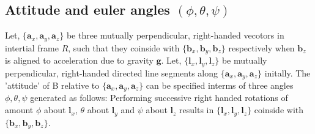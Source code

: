 
\subsection{Attitude and euler angles $(\phi, \theta, \psi)$}

Let, $\{ \pmb a_x, \pmb a_y, \pmb a_z \}$ be three mutually perpendicular,
right-handed vecotors in intertial frame $R$, such that they coinside with
$\{ \pmb b_x, \pmb b_y, \pmb b_z\}$ respectively when $\pmb b_z$ is aligned to
acceleration due to gravity $\pmb g$.
Let, $\{ \pmb l_x, \pmb l_y, \pmb l_z\}$ be mutually perpendicular,
right-handed directed line segments along $\{ \pmb a_x, \pmb a_y, \pmb a_z \}$
initally.
The 'attitude' of B relative to $\{ \pmb a_x, \pmb a_y, \pmb a_z \}$ can be
specified interms of  three angles $\phi, \theta, \psi$ generated as follows:
Performing successive right handed rotations of amount $\phi$ about $\pmb l_x$,
$\theta$ about $\pmb l_y$ and $\psi$ about $\pmb l_z$ results in $\{ \pmb l_x,
\pmb l_y, \pmb l_z\}$ coinside with $\{ \pmb b_x, \pmb b_y, \pmb b_z\}$.

